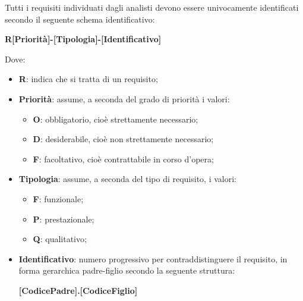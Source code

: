 Tutti i requisiti individuati dagli analisti devono essere univocamente identificati secondo il seguente schema identificativo:

\begin{center}
    \textbf{R[Priorit\`{a}]-[Tipologia]-[Identificativo]}
\end{center}

Dove:

\begin{itemize}
    \item \textbf{R}: indica che si tratta di un requisito;
    \item \textbf{Priorit\`{a}}: assume, a seconda del grado di priorit\`{a} i valori:
    \begin{itemize}
        \item \textbf{O}: obbligatorio, cio\`{e} strettamente necessario;
        \item \textbf{D}: desiderabile, cio\`{e} non strettamente necessario;
        \item \textbf{F}: facoltativo, cio\`{e} contrattabile in corso d'opera;
    \end{itemize}
    \item \textbf{Tipologia}: assume, a seconda del tipo di requisito, i valori:
    \begin{itemize}
        \item \textbf{F}: funzionale;
        \item \textbf{P}: prestazionale;
        \item \textbf{Q}: qualitativo;
    \end{itemize}
    \item \textbf{Identificativo}: numero progressivo per contraddistinguere il requisito, in forma gerarchica padre-figlio secondo la seguente struttura:
    \begin{center}
        \textbf{[CodicePadre].[CodiceFiglio]}
    \end{center}
\end{itemize}